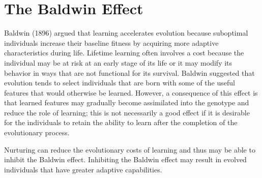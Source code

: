 \documentclass[master]{outhesis}
\begin{document}
\section{The Baldwin Effect}

Baldwin (1896) argued that learning accelerates evolution because suboptimal individuals increase their baseline fitness by acquiring more adaptive characteristics during life. 
Lifetime learning often involves a cost because the individual may be at risk at an early stage of its life or it may modify its behavior in ways that are not functional for its survival.
Baldwin suggested that evolution tends to select individuals that are born with some of the useful features that would otherwise be learned.
However, a consequence of this effect is that learned features may gradually become assimilated into the genotype and reduce the role of learning;
this is not necessarily a good effect if it is desirable for the individuals to retain the ability to learn after the completion of the evolutionary process. \cite{Floreano:2008wv} 

Nurturing can reduce the evolutionary costs of learning and thus may be able to inhibit the Baldwin effect.
Inhibiting the Baldwin effect may result in evolved individuals that have greater adaptive capabilities.

{}


\makebackmatter
\end{document}
